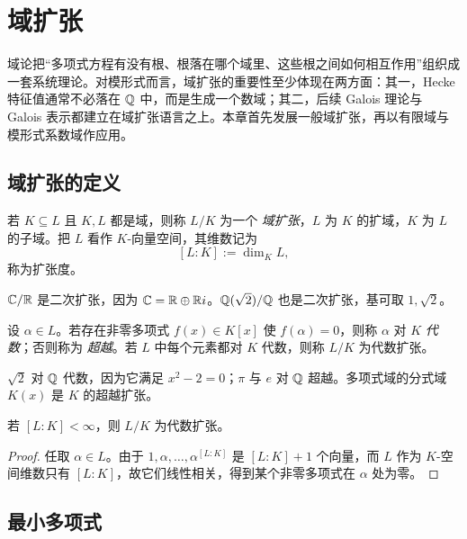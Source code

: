 \chapter{域扩张}

域论把“多项式方程有没有根、根落在哪个域里、这些根之间如何相互作用”组织成一套系统理论。对模形式而言，域扩张的重要性至少体现在两方面：其一，Hecke 特征值通常不必落在 $\mathbb{Q}$ 中，而是生成一个数域；其二，后续 Galois 理论与 Galois 表示都建立在域扩张语言之上。本章首先发展一般域扩张，再以有限域与模形式系数域作应用。

\section{域扩张的定义}

\begin{definition}
若 $K\subseteq L$ 且 $K,L$ 都是域，则称 $L/K$ 为一个 \emph{域扩张}，$L$ 为 $K$ 的扩域，$K$ 为 $L$ 的子域。把 $L$ 看作 $K$-向量空间，其维数记为
\[
[L:K]:=\dim_K L,
\]
称为扩张度。
\end{definition}

\begin{example}
$\mathbb{C}/\mathbb{R}$ 是二次扩张，因为 $\mathbb{C}=\mathbb{R}\oplus \mathbb{R} i$。$\mathbb{Q}(\sqrt2)/\mathbb{Q}$ 也是二次扩张，基可取 $1,\sqrt2$。
\end{example}

\begin{definition}
设 $\alpha\in L$。若存在非零多项式 $f(x)\in K[x]$ 使 $f(\alpha)=0$，则称 $\alpha$ 对 $K$ \emph{代数}；否则称为 \emph{超越}。若 $L$ 中每个元素都对 $K$ 代数，则称 $L/K$ 为代数扩张。
\end{definition}

\begin{example}
$\sqrt2$ 对 $\mathbb{Q}$ 代数，因为它满足 $x^2-2=0$；$\pi$ 与 $e$ 对 $\mathbb{Q}$ 超越。多项式域的分式域 $K(x)$ 是 $K$ 的超越扩张。
\end{example}

\begin{proposition}
若 $[L:K]<\infty$，则 $L/K$ 为代数扩张。
\end{proposition}

\begin{proof}
任取 $\alpha\in L$。由于 $1,\alpha,\dots,\alpha^{[L:K]}$ 是 $[L:K]+1$ 个向量，而 $L$ 作为 $K$-空间维数只有 $[L:K]$，故它们线性相关，得到某个非零多项式在 $\alpha$ 处为零。
\end{proof}

\section{最小多项式}

